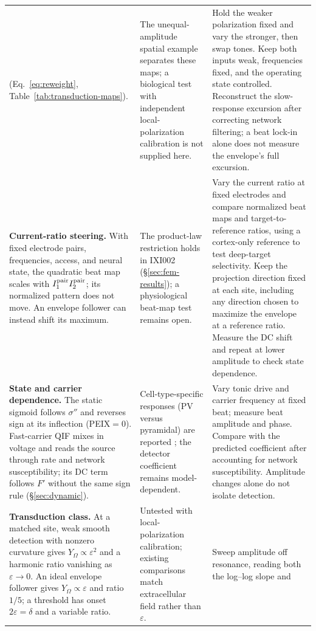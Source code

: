 \documentclass[11pt,a4paper]{article}
\newcommand{\Sig}{\sigma}
\begin{document}
\begin{longtable}{@{}>{\raggedright\arraybackslash}p{}
 >{\raggedright\arraybackslash}p{}
 >{\raggedright\arraybackslash}p{}@{}}
(Eq.~\eqref{eq:reweight}, Table~\ref{tab:transduction-maps}).
& The unequal-amplitude spatial example separates these maps; a biological test
with independent local-polarization calibration is not supplied here.
& Hold the weaker polarization fixed and vary the stronger, then swap tones.
Keep both inputs weak, frequencies fixed, and the operating state controlled.
Reconstruct the slow-response excursion after correcting network filtering;
a beat lock-in alone does not measure the envelope's full excursion. \\[4pt]
\textbf{Current-ratio steering.} With fixed electrode pairs, frequencies,
access, and neural state, the quadratic beat map scales with
$I_1^{\rm pair}I_2^{\rm pair}$; its normalized pattern does not move.
An envelope follower can instead shift its maximum.
& The product-law restriction \cite{cassara2025part2} holds in IXI002
(\S\ref{sec:fem-results}); a physiological beat-map test remains open.
& Vary the current ratio at fixed electrodes and compare normalized beat maps
and target-to-reference ratios, using a cortex-only reference to test deep-target
selectivity. Keep the projection direction fixed at each site,
including any direction chosen to maximize the envelope at a reference ratio.
Measure the DC shift and repeat at lower amplitude to check state dependence.
 \\[4pt]
\textbf{State and carrier dependence.} The static sigmoid follows $\Sig''$ and
reverses sign at its inflection (PEIX$=0$). Fast-carrier QIF mixes in voltage and
reads the source through rate and network susceptibility; its DC term follows
$F'$ without the same sign rule (\S\ref{sec:dynamic}).
& Cell-type-specific responses (PV versus pyramidal) are reported
\cite{caldas2024}; the detector coefficient remains model-dependent.
& Vary tonic drive and carrier frequency at fixed beat; measure beat amplitude
and phase. Compare with the predicted coefficient after accounting for network
susceptibility. Amplitude changes alone do not isolate detection. \\[4pt]
\textbf{Transduction class.} At a matched site, weak smooth detection with nonzero
curvature gives $Y_\Omega\propto\varepsilon^2$ and a harmonic ratio vanishing as
$\varepsilon\to0$. An ideal envelope follower gives $Y_\Omega\propto\varepsilon$
and ratio $1/5$; a threshold has onset $2\varepsilon=\delta$ and a variable ratio.
& Untested with local-polarization calibration; existing comparisons match
extracellular field rather than $\varepsilon$.
& Sweep amplitude off resonance, reading both the log--log slope and

\end{longtable}
\end{document}

